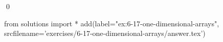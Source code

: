 
\begin{ex}
  \label{ex:6-17-one-dimensional-arrays}
  
  \qed
\end{ex}
\begin{python0}
from solutions import *
add(label="ex:6-17-one-dimensional-arrays",
    srcfilename='exercises/6-17-one-dimensional-arrays/answer.tex')
\end{python0}
